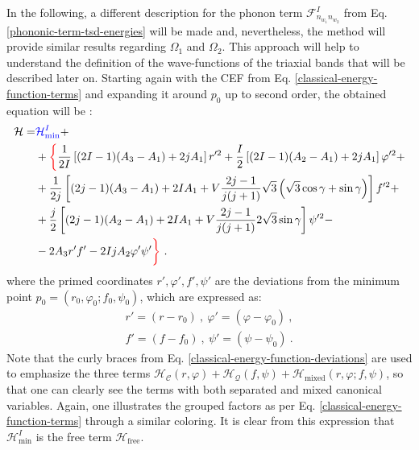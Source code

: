 In the following, a different description for the phonon term $\mathcal{F}_{n_{w_1}n_{w_2}}^I$ from Eq. \ref{phononic-term-tsd-energies} will be made and, nevertheless, the method will provide similar results regarding $\Omega_1$ and $\Omega_2$. This approach will help to understand the definition of the wave-functions of the triaxial bands that will be described later on. Starting again with the CEF from Eq. \ref{classical-energy-function-terms} and expanding it around $p_0$ up to second order, the obtained equation will be \cite{raduta2020approach}:
\begin{align}
    \mathcal{H}=&{\color{blue}\mathcal{H}_\text{min}^I}+\nonumber\\
                &+{\color{red}\bigg\{}\frac{1}{2I}\left[(2I-1)(A_3-A_1)+2jA_1\right]r'^{2}+\frac{I}{2}\left[(2I-1)(A_2-A_1)+2jA_1\right]\varphi'^2+\nonumber\\
                &+\frac{1}{2j}\left[(2j-1)(A_3-A_1)+2IA_1+V\frac{2j-1}{j(j+1)}\sqrt{3}\left(\sqrt{3}\cos\gamma+\sin\gamma\right)\right]f'^2+\nonumber\\
                &+\frac{j}{2}\left[(2j-1)(A_2-A_1)+2IA_1+V\frac{2j-1}{j(j+1)}2\sqrt{3}\sin\gamma\right]\psi'^2-\nonumber\\
                &-2A_3r'f'-2IjA_2\varphi'\psi'{\color{red}\bigg\}}\ .
    \label{classical-energy-function-deviations}
\end{align}
where the primed coordinates $r',\varphi',f',\psi'$ are the deviations from the minimum point $p_0=(r_0,\varphi_0;f_0,\psi_0)$, which are expressed as:
\begin{align}
    r'=(r-r_0)\ ,\ \varphi'=(\varphi-\varphi_0)\ ,\nonumber\\
    f'=(f-f_0)\ ,\ \psi'=(\psi-\psi_0)\ .
\end{align}
Note that the curly braces from Eq. \ref{classical-energy-function-deviations} are used to emphasize the three terms $\mathcal{H}_\mathscr{C}(r,\varphi)+\mathcal{H}_\mathcal{Q}(f,\psi)+\mathcal{H}_\text{mixed}(r,\varphi;f,\psi)$, so that one can clearly see the terms with both separated and mixed canonical variables. Again, one illustrates the grouped factors as per Eq. \ref{classical-energy-function-terms} through a similar coloring. It is clear from this expression that $\mathcal{H}_\text{min}^I$ is the free term $\mathcal{H}_\text{free}$.

